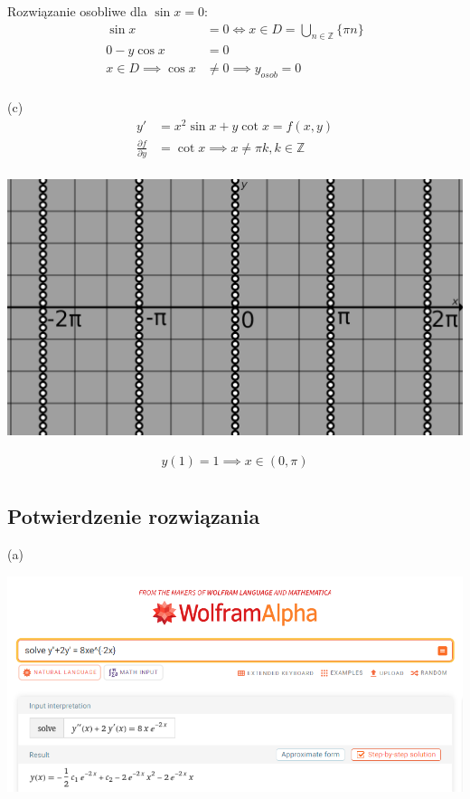 \documentclass[12pt]{article}
\newcommand{\zset}{\mathbb{Z}}
\begin{document}
Rozwiązanie osobliwe dla $\sin x = 0$:
\begin{align*}
    \sin x &= 0 \iff x \in D = \bigcup_{n\in\zset}\{\pi n\} \\
    0-y \cos x &= 0 \\
    x \in D \implies \cos x &\neq 0 \implies y_{osob} = 0 \\
\end{align*}

(c)
\begin{align*}
    y' &= x^2 \sin x + y \cot x = f(x, y) \\
    \frac{\partial f}{\partial y} &= \cot x \implies x \neq \pi k, k\in\zset \\
\end{align*}

\begin{center}\includegraphics[scale=1]{am_5_fig.png}\end{center}


\begin{align*}
    y(1) = 1 \implies x \in (0, \pi ) \\
\end{align*}
\pagebreak

\subsection{Potwierdzenie rozwiązania}
(a)

\includegraphics[scale=0.425]{am_5_a.png}
\end{document}
